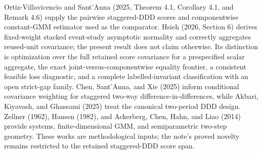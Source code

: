 Ortiz-Villavicencio and Sant'Anna (2025, Theorem 4.1, Corollary 4.1, and Remark 4.6) supply the pairwise staggered-DDD scores and componentwise constant-GMM estimator used as the comparator. Hsieh (2026, Section 6) derives fixed-weight stacked event-study asymptotic normality and correctly aggregates reused-unit covariance; the present result does not claim otherwise. Its distinction is optimization over the full retained score covariance for a prespecified scalar aggregate, the exact joint-versus-componentwise equality frontier, a consistent feasible loss diagnostic, and a complete labelled-invariant classification with an open strict-gap family. Chen, Sant'Anna, and Xie (2025) inform conditional covariance weighting for staggered two-way difference-in-differences, while Akbari, Kiyavash, and Ghassami (2025) treat the canonical two-period DDD design. Zellner (1962), Hansen (1982), and Ackerberg, Chen, Hahn, and Liao (2014) provide systems, finite-dimensional GMM, and semiparametric two-step geometry. These works are methodological inputs; the note's proved novelty remains restricted to the retained staggered-DDD score span.